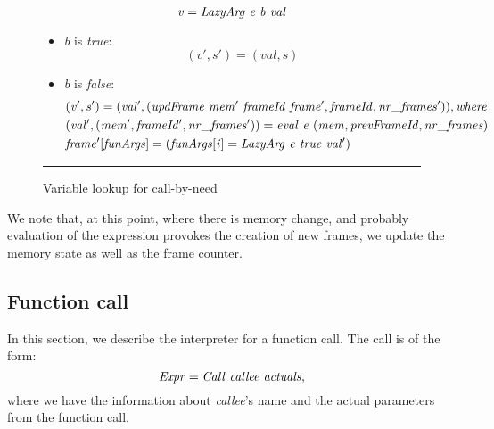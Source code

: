 \documentclass[diploma]{softlab-thesis}
\begin{document}
\begin{itemize}
    \begin{figure}[t]
      \[\mathit{v = LazyArg \hfill\ e \hfill\ b \hfill\ val}\]
      
      \begin{itemize}
          \item \textit{b} is \textit{true}: \[ \mathit{(v', s') = (val, s)} \]
          \item \textit{b} is \textit{false}:
            \begin{align*}
                & \mathit{(v', s') = (val', (updFrame \hfill\ mem' \hfill\ frameId \hfill\ frame', frameId, nr\_frames')), where} \\
                & \mathit{(val', (mem', frameId', nr\_frames')) = eval \hfill\ e \hfill\ (mem, prevFrameId, nr\_frames)} \\
                & \mathit{frame'[funArgs] = ( funArgs[i] = LazyArg \hfill\ e \hfill\ true \hfill\ val' )} \\
            \end{align*}
      \end{itemize}
    \caption{Variable lookup for call-by-need\label{fig:lazy-varlookup}}
    \hrule
  \end{figure}


  We note that, at this point, where there is memory change, and probably evaluation of the expression provokes 
  the creation of new frames, we update the memory state as well as the frame counter. 

  \end{itemize}
  
\subsection{Function call}

In this section, we describe the interpreter for a function call. The call is of the form:
\[ 
  \mathit{Expr = Call \hfill\ callee \hfill\ actuals,} 
\]
where we have the information about \textit{callee}'s name and the actual parameters from the function call. 
\end{document}
